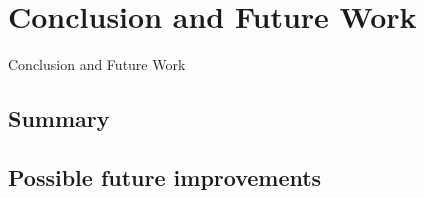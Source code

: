 \chapter{Conclusion and Future Work}
\label{Conclusion and Future Work}

Conclusion and Future Work

\section{Summary}
\section{Possible future improvements}